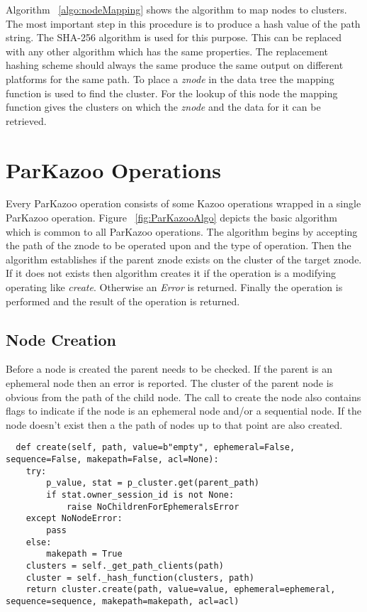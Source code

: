 

Algorithm ~\ref{algo:nodeMapping} shows the algorithm to map nodes to clusters. The most important step in this procedure is to produce a hash value of the path string. The  SHA-256 algorithm is used for this purpose. This can be replaced with any other algorithm which has the same properties. The replacement hashing scheme should always the same produce the same output on different platforms for the same path. To place a \textit{znode} in the data tree the mapping function is used to find the cluster. For the lookup of this node the mapping function gives the clusters on which the \textit{znode} and the data for it can be retrieved.


\section{ParKazoo Operations}
Every ParKazoo operation consists of some Kazoo operations wrapped in a single ParKazoo operation. Figure ~\ref{fig:ParKazooAlgo} depicts the basic algorithm which is common to all ParKazoo operations. The algorithm begins by accepting the path of the znode to be operated upon and the type of operation. Then the algorithm establishes if the parent znode exists on the cluster of the target znode. If it does not exists then algorithm creates it if the operation is a modifying operating like \textit{create}. Otherwise an \textit{Error} is returned. Finally the operation is performed and the result of the operation is returned. 



\subsection{Node Creation}
Before a node is created the parent needs to be checked. If the parent is an ephemeral node then an error is reported. The cluster of the parent node is obvious from the path of the child node. The call to create the node also contains flags to indicate if the node is an ephemeral node and/or a sequential node. If the node doesn't exist then a the path of nodes up to that point are also created.

\vspace{1.5em}


\begin{lstlisting}
  def create(self, path, value=b"empty", ephemeral=False, sequence=False, makepath=False, acl=None):
    try:
        p_value, stat = p_cluster.get(parent_path)
        if stat.owner_session_id is not None:
            raise NoChildrenForEphemeralsError
    except NoNodeError:
        pass
    else:
        makepath = True
    clusters = self._get_path_clients(path)
    cluster = self._hash_function(clusters, path)
    return cluster.create(path, value=value, ephemeral=ephemeral, sequence=sequence, makepath=makepath, acl=acl)
\end{lstlisting}

